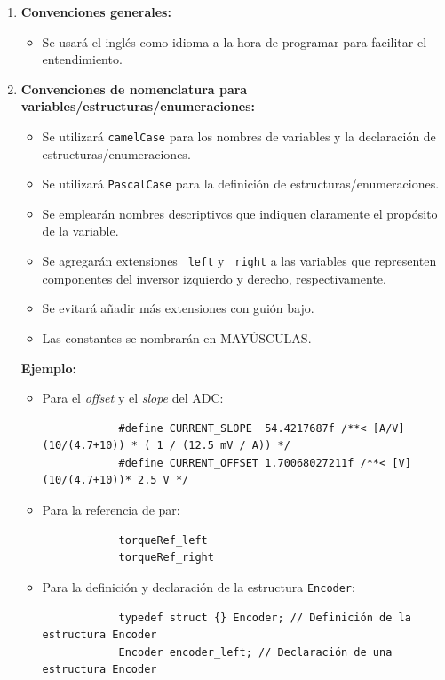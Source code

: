 \begin{enumerate}
	\item \textbf{Convenciones generales:}
	\begin{itemize}
		\item Se usará el inglés como idioma a la hora de programar para facilitar el entendimiento.
	\end{itemize}
	\item \textbf{Convenciones de nomenclatura para variables/estructuras/enumeraciones:}
	\begin{itemize}
		\item Se utilizará \texttt{camelCase} para los nombres de variables y la declaración de estructuras/enumeraciones.
		\item Se utilizará \texttt{PascalCase} para la definición de estructuras/enumeraciones.
		\item Se emplearán nombres descriptivos que indiquen claramente el propósito de la variable.
		\item Se agregarán extensiones \texttt{\_left} y \texttt{\_right} a las variables que representen componentes del inversor izquierdo y derecho, respectivamente.
		\item Se evitará añadir más extensiones con guión bajo.
		\item Las constantes se nombrarán en MAYÚSCULAS.
	\end{itemize}
	\textbf{Ejemplo:}
	\begin{itemize}
		\item Para el \textit{offset} y el \textit{slope} del ADC:
		{\small\begin{verbatim}
			#define CURRENT_SLOPE  54.4217687f /**< [A/V] (10/(4.7+10)) * ( 1 / (12.5 mV / A)) */
			#define CURRENT_OFFSET 1.70068027211f /**< [V] (10/(4.7+10))* 2.5 V */
		\end{verbatim}}
		\item Para la referencia de par:
		\begin{verbatim}
			torqueRef_left
			torqueRef_right
		\end{verbatim}
		\item Para la definición y declaración de la estructura \texttt{Encoder}:
		\begin{verbatim}
			typedef struct {} Encoder; // Definición de la estructura Encoder
			Encoder encoder_left; // Declaración de una estructura Encoder
		\end{verbatim}
		

\end{itemize}
\end{enumerate}
